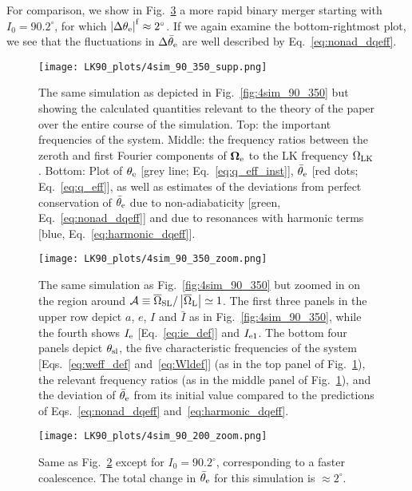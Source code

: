 \documentclass[
        twocolumn,
        twocolappendix
    ]{aastex63}
\newcommand*{\abs}[1]{\left|#1\right|}
\renewcommand*{\bm}[1]{\boldsymbol{\mathbf{#1}}}
\begin{document}
For comparison, we show in Fig.~\ref{fig:4sim_90_200_zoom} a more rapid
binary merger starting with $I_0 = 90.2^\circ$, for which $\abs{\Delta
\theta_{\rm e}}^{\rm f} \approx 2^\circ$. If we again examine the
bottom-rightmost plot, we see that the fluctuations in $\Delta \bar{\theta}_{\rm
e}$ are well described by Eq.~\eqref{eq:nonad_dqeff}.

\begin{figure}
    \centering
    \texttt{[image: LK90\_plots/4sim\_90\_350\_supp.png]}
    \caption{The same simulation as depicted in Fig.~\ref{fig:4sim_90_350} but
    showing the calculated quantities relevant to the theory of the paper over
    the entire course of the simulation. Top: the important frequencies of the
    system. Middle: the frequency ratios between the zeroth and first Fourier
    components of $\bm{\Omega}_{\rm e}$ to the LK frequency $\Omega_{\rm LK}$.
    Bottom: Plot of $\theta_{\rm e}$ [grey line; Eq.~\eqref{eq:q_eff_inst}],
    $\bar{\theta}_{\rm e}$ [red dots; Eq.~\eqref{eq:q_eff}], as well as
    estimates of the deviations from perfect conservation of $\bar{\theta}_{\rm
    e}$ due to non-adiabaticity [green, Eq.~\eqref{eq:nonad_dqeff}] and due
    to resonances with harmonic terms [blue,
    Eq.~\eqref{eq:harmonic_dqeff}].}\label{fig:4sim_90_350_supp}
\end{figure}
\begin{figure*}
    \centering
    \texttt{[image: LK90\_plots/4sim\_90\_350\_zoom.png]}
    \caption{The same simulation as Fig.~\ref{fig:4sim_90_350} but zoomed in
    on the region around $\mathcal{A} \equiv \overline{\Omega}_{\rm SL} /
    \abs{\overline{\Omega}_{\rm L}} \simeq 1$. The first three panels in the
    upper row
    depict $a$, $e$, $I$ and $\bar{I}$ as in Fig.~\ref{fig:4sim_90_350}, while the fourth shows $I_{\rm
    e}$ [Eq.~\eqref{eq:ie_def}] and $I_{\rm e1}$. The bottom four panels depict
    $\theta_{\rm sl}$, the five characteristic frequencies of the system
    [Eqs.~\ref{eq:weff_def} and~\eqref{eq:Wldef}] (as in
    the top panel of Fig.~\ref{fig:4sim_90_350_supp}), the relevant frequency
    ratios (as in the middle panel of Fig.~\ref{fig:4sim_90_350_supp}), and the
    deviation of $\bar{\theta}_{\rm e}$ from its initial value compared to the
    predictions of Eqs.~\eqref{eq:nonad_dqeff}
    and~\eqref{eq:harmonic_dqeff}.}\label{fig:4sim_90_350_zoom}
\end{figure*}

\begin{figure*}
    \centering
    \texttt{[image: LK90\_plots/4sim\_90\_200\_zoom.png]}
    \caption{Same as Fig.~\ref{fig:4sim_90_350_zoom} except for $I_0 =
    90.2^\circ$, corresponding to a faster coalescence. The total
    change in $\bar{\theta}_{\rm e}$ for this simulation is $\approx
    2^\circ$.}\label{fig:4sim_90_200_zoom}
\end{figure*}
\end{document}
